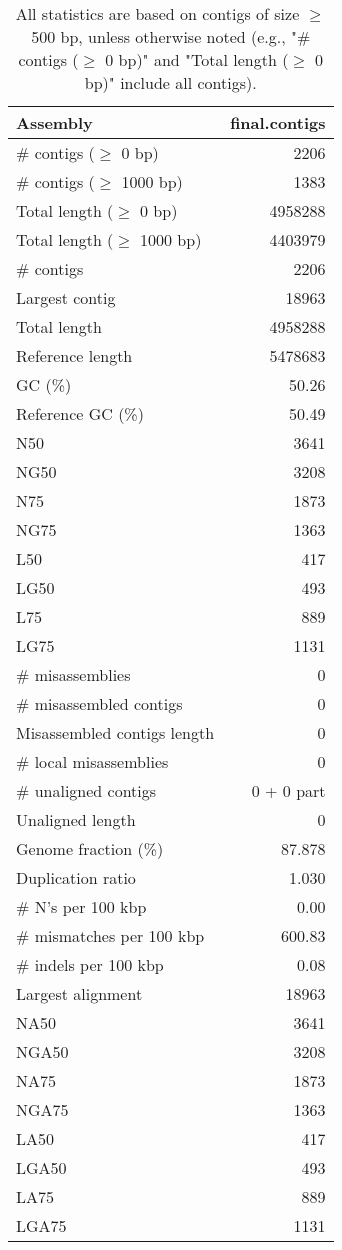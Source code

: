 \documentclass[12pt,a4paper]{article}
\begin{document}
\begin{table}[ht]
\begin{center}
\caption{All statistics are based on contigs of size $\geq$ 500 bp, unless otherwise noted (e.g., "\# contigs ($\geq$ 0 bp)" and "Total length ($\geq$ 0 bp)" include all contigs).}
\begin{tabular}{|l*{1}{|r}|}
\hline
Assembly & final.contigs \\ \hline
\# contigs ($\geq$ 0 bp) & 2206 \\ \hline
\# contigs ($\geq$ 1000 bp) & 1383 \\ \hline
Total length ($\geq$ 0 bp) & 4958288 \\ \hline
Total length ($\geq$ 1000 bp) & 4403979 \\ \hline
\# contigs & 2206 \\ \hline
Largest contig & 18963 \\ \hline
Total length & 4958288 \\ \hline
Reference length & 5478683 \\ \hline
GC (\%) & 50.26 \\ \hline
Reference GC (\%) & 50.49 \\ \hline
N50 & 3641 \\ \hline
NG50 & 3208 \\ \hline
N75 & 1873 \\ \hline
NG75 & 1363 \\ \hline
L50 & 417 \\ \hline
LG50 & 493 \\ \hline
L75 & 889 \\ \hline
LG75 & 1131 \\ \hline
\# misassemblies & 0 \\ \hline
\# misassembled contigs & 0 \\ \hline
Misassembled contigs length & 0 \\ \hline
\# local misassemblies & 0 \\ \hline
\# unaligned contigs & 0 + 0 part \\ \hline
Unaligned length & 0 \\ \hline
Genome fraction (\%) & 87.878 \\ \hline
Duplication ratio & 1.030 \\ \hline
\# N's per 100 kbp & 0.00 \\ \hline
\# mismatches per 100 kbp & 600.83 \\ \hline
\# indels per 100 kbp & 0.08 \\ \hline
Largest alignment & 18963 \\ \hline
NA50 & 3641 \\ \hline
NGA50 & 3208 \\ \hline
NA75 & 1873 \\ \hline
NGA75 & 1363 \\ \hline
LA50 & 417 \\ \hline
LGA50 & 493 \\ \hline
LA75 & 889 \\ \hline
LGA75 & 1131 \\ \hline
\end{tabular}
\end{center}
\end{table}
\end{document}
